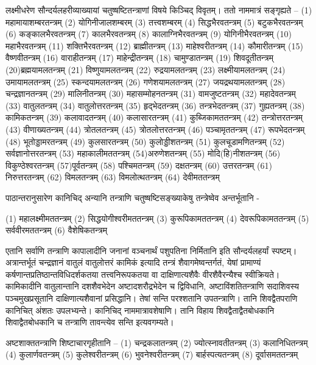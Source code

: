 लक्ष्मीधरेण सौन्दर्यलहरीव्याख्यायां चतुष्षष्टितन्त्राणां विषये किञ्चिद् विवृतम्। ततो नाममात्रं सङ्गृह्यते –
(1) महामायाशम्बरतन्त्रम् (2) योगिनीजालशम्बरम् (3) तत्त्वशम्बरम् (4) सिद्धभैरवतन्त्रम् (5) बटुकभैरवतन्त्रम् (6) कङ्कालभैरवतन्त्रम् (7) कालभैरवतन्त्रम् (8) कालाग्निभैरवतन्त्रम् (9) योगिनीभैरवतन्त्रम् (10) महाभैरवतन्त्रम् (11) शक्तिभैरवतन्त्रम् (12) ब्राह्मीतन्त्रम् (13) माहेश्वरीतन्त्रम् (14) कौमारीतन्त्रम् (15) वैष्णवीतन्त्रम् (16) वाराहीतन्त्रम् (17) माहेन्द्रीतन्त्रम् (18) चामुण्डातन्त्रम् (19) शिवदूतीतन्त्रम् (20)ब्रह्मयामलतन्त्रम् (21) विष्णुयामलतन्त्रम् (22) रुद्रयामलतन्त्रम् (23) लक्ष्मीयामलतन्त्रम् (24) उमायामलतन्त्रम् (25) स्कन्दयामलतन्त्रम् (26) गणेशयामलतन्त्रम् (27) जयद्रथयामलतन्त्रम् (28) चन्द्रज्ञानतन्त्रम् (29) मालिनीतन्त्रम् (30) महासम्मोहनतन्त्रम् (31) वामजुष्टतन्त्रम् (32) महादेवतन्त्रम् (33) वातुलतन्त्रम् (34) वातुलोत्तरतन्त्रम् (35) हृद्भेदतन्त्रम् (36) तन्त्रभेदतन्त्रम् (37) गुह्यतन्त्रम् (38) कामिकतन्त्रम् (39) कलावादतन्त्रम् (40) कलासारतन्त्रम् (41) कुब्जिकामततन्त्रम् (42) तन्त्रोत्तरतन्त्रम् (43) वीणाख्यतन्त्रम् (44) त्रोतलतन्त्रम् (45) त्रोतलोत्तरतन्त्रम् (46) पञ्चामृततन्त्रम् (47) रूपभेदतन्त्रम् (48) भूतोड्डामरतन्त्रम् (49) कुलसारतन्त्रम् (50) कुलोड्डीशतन्त्रम् (51) कुलचूडामणितन्त्रम् (52) सर्वज्ञानोत्तरतन्त्रम् (53) महाकालीमततन्त्रम् (54)अरुणेशतन्त्रम् (55) मोदि(हि)नीशतन्त्रम् (56) विकुण्ठेश्वरतन्त्रम् (57)पूर्वतन्त्रम् (58) पश्चिमतन्त्रम् (59) दक्षतन्त्रम् (60) उत्तरतन्त्रम् (61) निरुत्तरतन्त्रम् (62) विमलतन्त्रम् (63) विमलोत्थतन्त्रम् (64) देवीमततन्त्रम्

पाठान्तरानुसारेण कानिचिद् अन्यानि तन्त्राणि चतुष्षष्टिसङ्ख्याकेषु तन्त्रेष्वेव अन्तर्भूतानि -

(1) महालक्ष्मीमततन्त्रम् 	(2) 	सिद्धयोगीश्वरीमततन्त्रम् 	(3) 	कुरूपिकामततन्त्रम् 	(4) 	देवरूपिकामततन्त्रम् 	(5) 	सर्ववीरमततन्त्रम् 	(6) 	वैशेषिकतन्त्रम्

एतानि सर्वाणि तन्त्राणि कापालादीनि जनानां वञ्चनार्थं पशुपतिना निर्मितानि इति सौन्दर्यलहर्यां स्पष्टम्। अत्रान्तर्भूतं चन्द्रज्ञानं वातुलं वातुलोत्तरं कामिकं इत्यादि तन्त्रं शैवागमेष्वन्तर्गतं, येषां प्रामाण्यं कर्षणान्तप्रतिष्ठान्तविधिदर्शकतया तत्त्वनिरूपकतया वा दाक्षिणात्यशैवैः वीरशैवैरन्यैश्च स्वीक्रियते। कामिकादीनि वातुलान्तानि दशशैवभेदेन अष्टादशरौद्रभेदेन च द्विविधानि, अष्टाविंशतितन्त्राणि सदाशिवस्य पञ्चमुखप्रसूतानि दाक्षिणात्यशैवानां प्रसिद्धानि। तेषां सन्ति परश्शतानि उपतन्त्राणि। तानि शिवद्वैतपराणि कानिचित् अंशतः उपलभ्यन्ते। कानिचिद् नाममात्रावशेषाणि। तानि विहाय शिवद्वैताद्वैतबोधकानि शिवाद्वैतबोधकानि च तन्त्राणि तावन्त्येव सन्ति इत्यवगम्यते।

अष्टशाक्ततन्त्राणि शिष्टाचारगृहीतानि – (1) चन्द्रकलातन्त्रम् (2) ज्योत्स्नावतीतन्त्रम् (3) कलानिधितन्त्रम् (4) कुलार्णवतन्त्रम् (5) कुलेश्वरीतन्त्रम् (6) भुवनेश्वरीतन्त्रम् (7) बार्हस्पत्यतन्त्रम् (8) दूर्वासमततन्त्रम्

